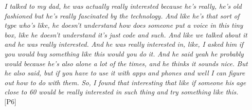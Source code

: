             \textit{
            I talked to my dad, he was actually really interested because he's really, he's old fashioned but he's really fascinated by the technology. And like he's that sort of type who's like, he doesn't understand how does someone put a voice in this tiny box, like he doesn't understand it's just code and such. And like we talked about it and he was really interested. And he was really interested in, like, I asked him if you would buy something like this would you do it. And he said yeah he probably would because he's also alone a lot of the times, and he thinks it sounds nice. But he also said, but if you have to use it with apps and phones and well I can figure out how to do with them. So, I found that interesting that like if someone his age close to 60 would be really interested in such thing and try something like this.
            }
            [P6]
            

